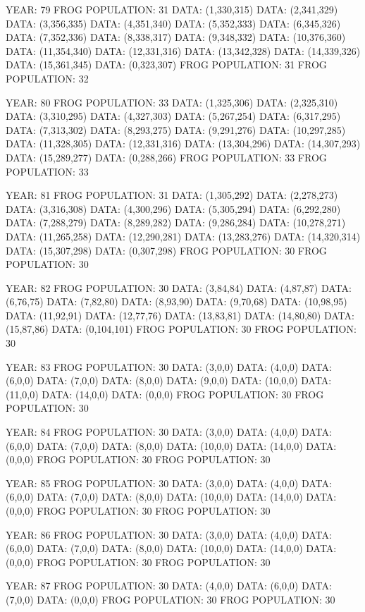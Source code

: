 \documentclass[12pt,a4paper]{article}
\begin{document}
{YEAR: 79
FROG POPULATION: 31
DATA: (1,330,315)
DATA: (2,341,329)
DATA: (3,356,335)
DATA: (4,351,340)
DATA: (5,352,333)
DATA: (6,345,326)
DATA: (7,352,336)
DATA: (8,338,317)
DATA: (9,348,332)
DATA: (10,376,360)
DATA: (11,354,340)
DATA: (12,331,316)
DATA: (13,342,328)
DATA: (14,339,326)
DATA: (15,361,345)
DATA: (0,323,307)
FROG POPULATION: 31
FROG POPULATION: 32

YEAR: 80
FROG POPULATION: 33
DATA: (1,325,306)
DATA: (2,325,310)
DATA: (3,310,295)
DATA: (4,327,303)
DATA: (5,267,254)
DATA: (6,317,295)
DATA: (7,313,302)
DATA: (8,293,275)
DATA: (9,291,276)
DATA: (10,297,285)
DATA: (11,328,305)
DATA: (12,331,316)
DATA: (13,304,296)
DATA: (14,307,293)
DATA: (15,289,277)
DATA: (0,288,266)
FROG POPULATION: 33
FROG POPULATION: 33

YEAR: 81
FROG POPULATION: 31
DATA: (1,305,292)
DATA: (2,278,273)
DATA: (3,316,308)
DATA: (4,300,296)
DATA: (5,305,294)
DATA: (6,292,280)
DATA: (7,288,279)
DATA: (8,289,282)
DATA: (9,286,284)
DATA: (10,278,271)
DATA: (11,265,258)
DATA: (12,290,281)
DATA: (13,283,276)
DATA: (14,320,314)
DATA: (15,307,298)
DATA: (0,307,298)
FROG POPULATION: 30
FROG POPULATION: 30

YEAR: 82
FROG POPULATION: 30
DATA: (3,84,84)
DATA: (4,87,87)
DATA: (6,76,75)
DATA: (7,82,80)
DATA: (8,93,90)
DATA: (9,70,68)
DATA: (10,98,95)
DATA: (11,92,91)
DATA: (12,77,76)
DATA: (13,83,81)
DATA: (14,80,80)
DATA: (15,87,86)
DATA: (0,104,101)
FROG POPULATION: 30
FROG POPULATION: 30

YEAR: 83
FROG POPULATION: 30
DATA: (3,0,0)
DATA: (4,0,0)
DATA: (6,0,0)
DATA: (7,0,0)
DATA: (8,0,0)
DATA: (9,0,0)
DATA: (10,0,0)
DATA: (11,0,0)
DATA: (14,0,0)
DATA: (0,0,0)
FROG POPULATION: 30
FROG POPULATION: 30

YEAR: 84
FROG POPULATION: 30
DATA: (3,0,0)
DATA: (4,0,0)
DATA: (6,0,0)
DATA: (7,0,0)
DATA: (8,0,0)
DATA: (10,0,0)
DATA: (14,0,0)
DATA: (0,0,0)
FROG POPULATION: 30
FROG POPULATION: 30

YEAR: 85
FROG POPULATION: 30
DATA: (3,0,0)
DATA: (4,0,0)
DATA: (6,0,0)
DATA: (7,0,0)
DATA: (8,0,0)
DATA: (10,0,0)
DATA: (14,0,0)
DATA: (0,0,0)
FROG POPULATION: 30
FROG POPULATION: 30

YEAR: 86
FROG POPULATION: 30
DATA: (3,0,0)
DATA: (4,0,0)
DATA: (6,0,0)
DATA: (7,0,0)
DATA: (8,0,0)
DATA: (10,0,0)
DATA: (14,0,0)
DATA: (0,0,0)
FROG POPULATION: 30
FROG POPULATION: 30

YEAR: 87
FROG POPULATION: 30
DATA: (4,0,0)
DATA: (6,0,0)
DATA: (7,0,0)
DATA: (0,0,0)
FROG POPULATION: 30
FROG POPULATION: 30

}
\end{document}

